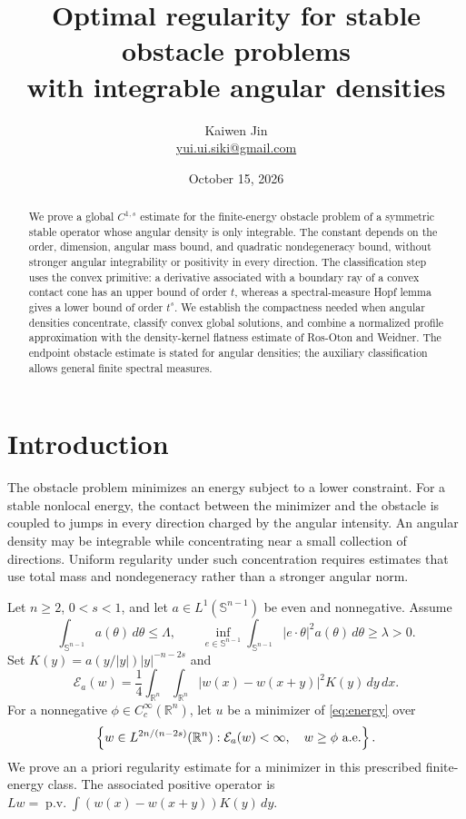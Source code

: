 \documentclass[11pt]{article}
\title{Optimal regularity for stable obstacle problems\\with integrable angular densities}
\author{Kaiwen Jin\\\small\href{mailto:yui.ui.siki@gmail.com}{yui.ui.siki@gmail.com}}
\date{October 15, 2026}
\numberwithin{equation}{section}
\theoremstyle{remark}
\newcommand{\R}{\mathbb R}
\newcommand{\Sph}{\mathbb S^{n-1}}
\newcommand{\abs}[1]{\lvert #1\rvert}
\newcommand{\dd}{\,d}
\begin{document}
\maketitle
\begin{abstract}
We prove a global $C^{1,s}$ estimate for the finite-energy obstacle problem of a symmetric stable operator whose angular density is only integrable. The constant depends on the order, dimension, angular mass bound, and quadratic nondegeneracy bound, without stronger angular integrability or positivity in every direction. The classification step uses the convex primitive: a derivative associated with a boundary ray of a convex contact cone has an upper bound of order $t$, whereas a spectral-measure Hopf lemma gives a lower bound of order $t^s$. We establish the compactness needed when angular densities concentrate, classify convex global solutions, and combine a normalized profile approximation with the density-kernel flatness estimate of Ros-Oton and Weidner. The endpoint obstacle estimate is stated for angular densities; the auxiliary classification allows general finite spectral measures.
\end{abstract}
\section{Introduction}\label{sec:intro}

The obstacle problem minimizes an energy subject to a lower constraint. For a stable nonlocal energy, the contact between the minimizer and the obstacle is coupled to jumps in every direction charged by the angular intensity. An angular density may be integrable while concentrating near a small collection of directions. Uniform regularity under such concentration requires estimates that use total mass and nondegeneracy rather than a stronger angular norm.

Let $n\ge2$, $0<s<1$, and let $a\in L^1(\Sph)$ be even and nonnegative. Assume
\begin{equation}\label{eq:angular}
 \int_{\Sph}a(\theta)\dd\theta\le\Lambda,
 \qquad \inf_{e\in\Sph}\int_{\Sph}\abs{e\cdot\theta}^2a(\theta)\dd\theta\ge\lambda>0.
\end{equation}
Set $K(y)=a(y/\abs y)\abs y^{-n-2s}$ and
\begin{equation}\label{eq:energy}
 \mathcal E_a(w)=\frac14\int_{\R^n}\int_{\R^n}
 \abs{w(x)-w(x+y)}^2K(y)\dd y\dd x.
\end{equation}
For a nonnegative $\phi\in C_c^\infty(\R^n)$, let $u$ be a minimizer of \eqref{eq:energy} over
\begin{equation}\label{eq:admissible}
 \left\{w\in L^{2n/(n-2s)}(\R^n):
       \mathcal E_a(w)<\infty,\quad w\ge\phi\ \hbox{a.e.}\right\}.
\end{equation}
We prove an a priori regularity estimate for a minimizer in this prescribed finite-energy class. The associated positive operator is $Lw=\operatorname{p.v.}\int(w(x)-w(x+y))K(y)\dd y$.
\end{document}
